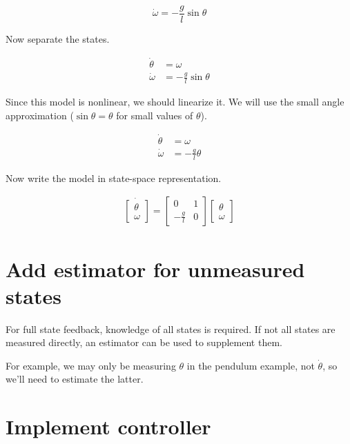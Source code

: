 \begin{equation*}
  \dot{\omega} = -\frac{g}{l}\sin\theta
\end{equation*}

Now separate the states.

\begin{align*}
  \dot{\theta} &= \omega \\
  \dot{\omega} &= -\frac{g}{l} \sin\theta
\end{align*}

Since this \gls{model} is nonlinear, we should linearize it. We will use the
small angle approximation ($\sin\theta = \theta$ for small values of $\theta$).

\begin{align*}
  \dot{\theta} &= \omega \\
  \dot{\omega} &= -\frac{g}{l} \theta
\end{align*}

Now write the model in state-space representation.

\begin{align}
  \dot{
  \begin{bmatrix}
    \theta \\
    \omega
  \end{bmatrix}} =
  \begin{bmatrix}
    0 & 1 \\
    -\frac{g}{l} & 0
  \end{bmatrix}
  \begin{bmatrix}
    \theta \\
    \omega
  \end{bmatrix}
\end{align}

\section{Add estimator for unmeasured states}

For full state feedback, knowledge of all states is required. If not all states
are measured directly, an estimator can be used to supplement them.

For example, we may only be measuring $\theta$ in the pendulum example, not
$\dot{\theta}$, so we'll need to estimate the latter.

\section{Implement controller}

